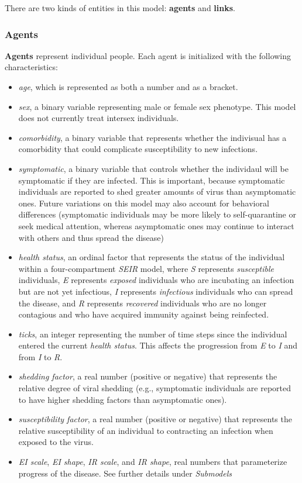 \documentclass[nofonts,]{tufte-handout}
\providecommand{\tightlist}{%
  \setlength{\itemsep}{0pt}\setlength{\parskip}{0pt}}
\begin{document}
There are two kinds of entities in this model: \textbf{agents} and
\textbf{links}.

\hypertarget{agents}{%
\subsubsection{Agents}\label{agents}}

\textbf{Agents} represent individual people. Each agent is initialized
with the following characteristics:

\begin{itemize}
\tightlist
\item
  \emph{age}, which is represented as both a number and as a bracket.
\item
  \emph{sex}, a binary variable representing male or female sex
  phenotype. This model does not currently treat intersex individuals.
\item
  \emph{comorbidity}, a binary variable that represents whether the
  indivisual has a comorbidity that could complicate susceptibility to
  new infections.
\item
  \emph{symptomatic}, a binary variable that controls whether the
  individaul will be symptomatic if they are infected. This is
  important, because symptomatic individuals are reported to shed
  greater amounts of virus than asymptomatic ones. Future variations on
  this model may also account for behavioral differences (symptomatic
  individuals may be more likely to self-quarantine or seek medical
  attention, whereas asymptomatic ones may continue to interact with
  others and thus spread the disease)
\item
  \emph{health status}, an ordinal factor that represents the status of
  the individual within a four-compartment \emph{SEIR} model, where
  \emph{S} represents \emph{susceptible} individuals, \emph{E}
  represents \emph{exposed} individuals who are incubating an infection
  but are not yet infectious, \emph{I} represents \emph{infectious}
  individuals who can spread the disease, and \emph{R} represents
  \emph{recovered} individuals who are no longer contagious and who have
  acquired immunity against being reinfected.
\item
  \emph{ticks}, an integer representing the number of time steps since
  the individual entered the current \emph{health status}. This affects
  the progression from \emph{E} to \emph{I} and from \emph{I} to
  \emph{R}.
\item
  \emph{shedding factor}, a real number (positive or negative) that
  represents the relative degree of viral shedding (e.g., symptomatic
  individuals are reported to have higher shedding factors than
  asymptomatic ones).
\item
  \emph{susceptibility factor}, a real number (positive or negative)
  that represents the relative susceptibility of an individual to
  contracting an infection when exposed to the virus.
\item
  \emph{EI scale}, \emph{EI shape}, \emph{IR scale}, and \emph{IR
  shape}, real numbers that parameterize progress of the disease. See
  further details under \emph{Submodels}
\end{itemize}
\end{document}
